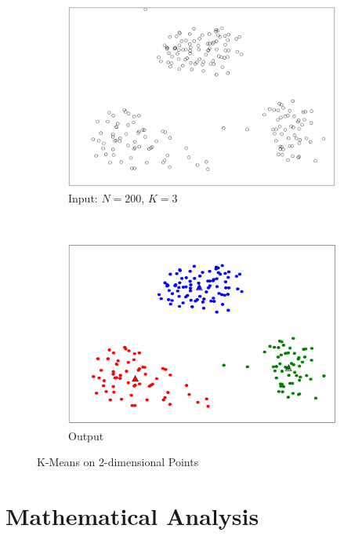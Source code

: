 \documentclass[conference]{IEEEtran}
\begin{document}
\begin{figure}[H]
    \centering
    \begin{subfigure}[b]{0.2\textwidth}
        \includegraphics[width=\textwidth]{fig1}
        \caption{Input: $N=200$, $K=3$}
        \label{fig:Input}
    \end{subfigure}
    ~ %
    \begin{subfigure}[b]{0.2\textwidth}
        \includegraphics[width=\textwidth]{fig2}
        \caption{Output}
        \label{fig:Output}
    \end{subfigure}
    \caption{K-Means on 2-dimensional Points}
\end{figure}

\section{Mathematical Analysis}
\end{document}
